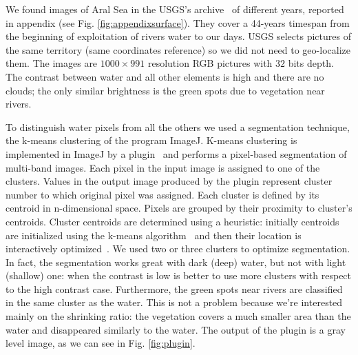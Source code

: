 We found images of Aral Sea in the USGS's archive~\cite{images} of different years, reported in appendix (see Fig. \ref{fig:appendixsurface}).
They cover a 44-years timespan from the beginning of exploitation of rivers water to our days. 
USGS selects pictures of the same territory (same coordinates reference) so we did not need to geo-localize them. 
The images are $1000 \times 991$ resolution RGB pictures with $32$ bits depth. 
The contrast between water and all other elements is high and there are no clouds; the only similar brightness is the green spots due to vegetation near rivers.

To distinguish water pixels from all the others we used a segmentation technique, the k-means clustering of the program ImageJ. 
K-means clustering is implemented in ImageJ by a plugin~\cite{plugin} and performs a pixel-based segmentation of multi-band images. 
Each pixel in the input image is assigned to one of the clusters. 
Values in the output image produced by the plugin represent cluster number to which original pixel was assigned. 
Each cluster is defined by its centroid in n-dimensional space. 
Pixels are grouped by their proximity to cluster's centroids. 
Cluster centroids are determined using a heuristic: initially centroids are initialized using the k-means algorithm~\cite{kmeans} and then their location is interactively optimized~\cite{plugin}.
We used two or three clusters to optimize segmentation. 
In fact, the segmentation works great with dark (deep) water, but not with light (shallow) one: when the contrast is low is better to use more clusters with respect to the high contrast case. 
Furthermore, the green spots near rivers are classified in the same cluster as the water. 
This is not a problem because we're interested mainly on the shrinking ratio: the vegetation covers a much smaller area than the water and disappeared similarly to the water. 
The output of the plugin is a gray level image, as we can see in Fig. \ref{fig:plugin}.
